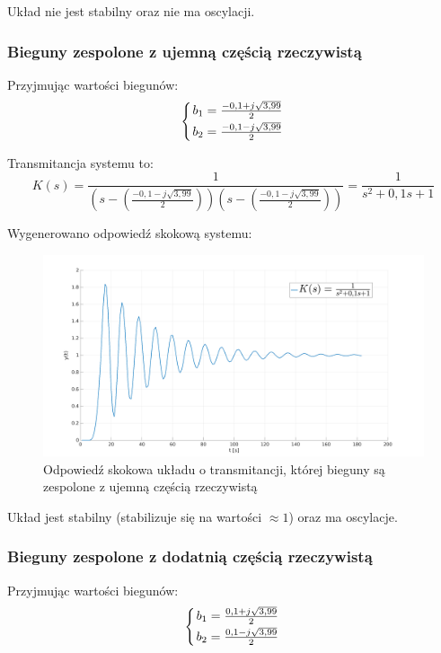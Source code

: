 \documentclass[12pt]{article}
\begin{document}
Układ nie jest stabilny oraz nie ma oscylacji.


\subsubsection{Bieguny zespolone z ujemną częścią rzeczywistą}

Przyjmując wartości biegunów:
\begin{equation*}
    \left\{{{b_1 = \frac{-0,1 + j \sqrt{3,99}}{2}}\atop {b_2 = \frac{-0,1 - j \sqrt{3,99}}{2}}}\right.
\end{equation*}

Transmitancja systemu to:
\begin{equation}
    K(s) = \frac{1}{(s-(\frac{-0,1 - j \sqrt{3,99}}{2}))(s-(\frac{-0,1 - j \sqrt{3,99}}{2}))} = \frac{1}{s^2+0,1s+1}
\end{equation}

Wygenerowano odpowiedź skokową systemu:

\begin{figure}[H]
    \centering
    \includegraphics[width=18cm]{zespolone_ujemne.png}
    \caption{Odpowiedź skokowa układu o transmitancji, której bieguny są zespolone z ujemną częścią rzeczywistą}
\end{figure}

Układ jest stabilny (stabilizuje się na wartości $\approx 1$) oraz ma oscylacje.

\subsubsection{Bieguny zespolone z dodatnią częścią rzeczywistą}

Przyjmując wartości biegunów:
\begin{equation*}
    \left\{{{b_1 = \frac{0,1 + j \sqrt{3,99}}{2}}\atop {b_2 = \frac{0,1 - j \sqrt{3,99}}{2}}}\right.
\end{equation*}
\end{document}
